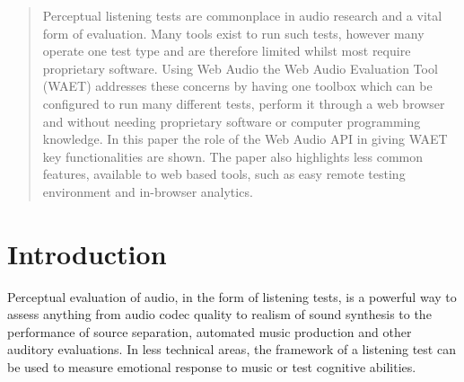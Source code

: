 \documentclass{sig-alternate}
\begin{document}
\date{1 October 2015}

\maketitle
\begin{abstract}

Perceptual listening tests are commonplace in audio research and a vital form of evaluation. Many tools exist to run such tests, however many operate one test type and are therefore limited whilst most require proprietary software. Using Web Audio the Web Audio Evaluation Tool (WAET) addresses these concerns by having one toolbox which can be configured to run many different tests, perform it through a web browser and without needing proprietary software or computer programming knowledge. In this paper the role of the Web Audio API in giving WAET key functionalities are shown. The paper also highlights less common features, available to web based tools, such as easy remote testing environment and in-browser analytics.

\end{abstract}


\section{Introduction}

	Perceptual evaluation of audio, in the form of listening tests, is a powerful way to assess anything from audio codec quality to realism of sound synthesis to the performance of source separation, automated music production and other auditory evaluations.
	In less technical areas, the framework of a listening test can be used to measure emotional response to music or test cognitive abilities. 
\end{document}
